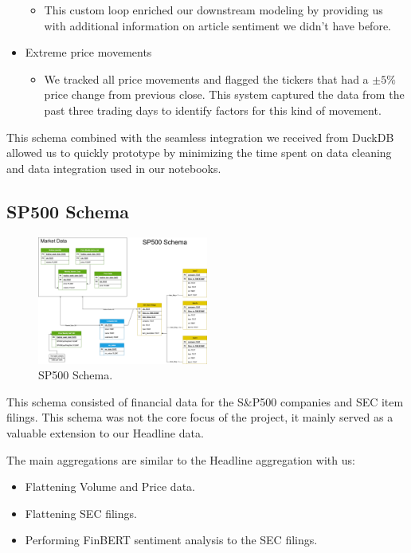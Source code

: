 \documentclass[twocolumn]{article}
\begin{document}
\begin{itemize}
\begin{itemize}
        \item This custom loop enriched our downstream modeling by providing us with additional information on article sentiment we didn't have before.
    \end{itemize}
    \item Extreme price movements
    \begin{itemize}
        \item We tracked all price movements and flagged the tickers that had a $\pm5\%$ price change from previous close. This system captured the data from the past three trading days to identify factors for this kind of movement. 
    \end{itemize}
\end{itemize}

This schema combined with the seamless integration we received from DuckDB allowed us to quickly prototype by minimizing the time spent on data cleaning and data integration used in our notebooks.

\subsection{SP500 Schema}
\begin{figure}[h!]
    \centering
    \includegraphics[width=0.5\textwidth]{sp500_schema.png}
    \caption{SP500 Schema.}
    \label{fig:headline-schema}
\end{figure}

This schema consisted of financial data for the S\&P500 companies and SEC item filings. This schema was not the core focus of the project, it mainly served as a valuable extension to our Headline data. 

The main aggregations are similar to the Headline aggregation with us:
\begin{itemize}
    \item Flattening Volume and Price data.
    \item Flattening SEC filings.
    \item Performing FinBERT sentiment analysis to the SEC filings.
\end{itemize}
\end{document}
